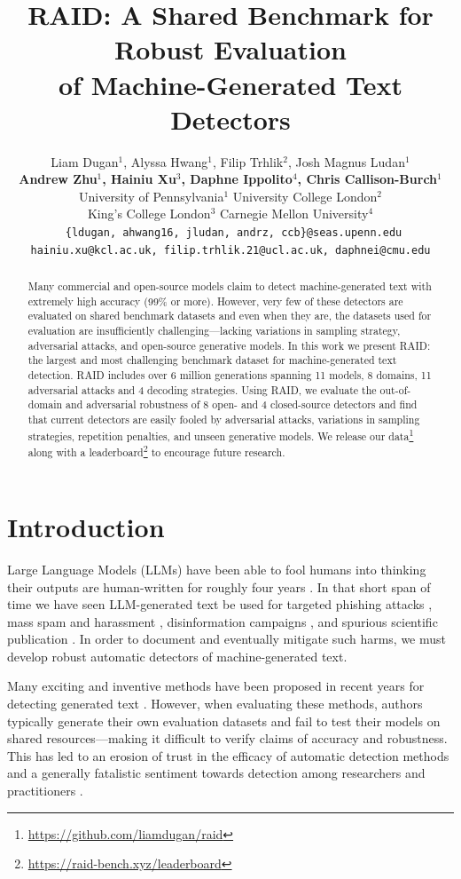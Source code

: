 \documentclass[11pt]{article}
\title{RAID: A Shared Benchmark for Robust Evaluation \\ of Machine-Generated Text Detectors}
\author{Liam Dugan$^1$, \hspace{0.25cm} Alyssa Hwang$^1$, \hspace{0.25cm} Filip Trhlik$^2$, \hspace{0.25cm} Josh Magnus Ludan$^1$\\\textbf{Andrew Zhu$^1$, \hspace{0.25cm} Hainiu Xu$^3$, \hspace{0.25cm} Daphne Ippolito$^4$, \hspace{0.25cm} Chris Callison-Burch$^1$} \\
University of Pennsylvania$^1$ \hspace{0.25cm} University College London$^2$\\ King's College London$^3$ \hspace{0.25cm} Carnegie Mellon University$^4$\\\ 
{\tt \normalsize \{ldugan, ahwang16, jludan, andrz, ccb\}@seas.upenn.edu}\\ \tt \normalsize hainiu.xu@kcl.ac.uk, filip.trhlik.21@ucl.ac.uk, daphnei@cmu.edu}
\begin{document}
\maketitle
\begin{abstract}
Many commercial and open-source models claim to detect machine-generated text with extremely high accuracy (99\% or more). However, very few of these detectors are evaluated on shared benchmark datasets and even when they are, the datasets used for evaluation are insufficiently challenging—lacking variations in sampling strategy, adversarial attacks, and open-source generative models. In this work we present RAID: the largest and most challenging benchmark dataset for machine-generated text detection. RAID includes over 6 million generations spanning 11 models, 8 domains, 11 adversarial attacks and 4 decoding strategies. Using RAID, we evaluate the out-of-domain and adversarial robustness of 8 open- and 4 closed-source detectors and find that current detectors are easily fooled by adversarial attacks, variations in sampling strategies, repetition penalties, and unseen generative models. We release our data\footnote{\url{https://github.com/liamdugan/raid}} along with a leaderboard\footnote{\url{https://raid-bench.xyz/leaderboard}} to encourage future research.
\end{abstract}

\section{Introduction}
Large Language Models (LLMs) have been able to fool humans into thinking their outputs are human-written for roughly four years \cite{dugan-etal-2020-roft, clark-etal-2021-thats}. In that short span of time we have seen LLM-generated text be used for targeted phishing attacks \cite{baki-etal-2017-scaling,hazell2023large}, mass spam and harassment \cite{weiss2019}, disinformation campaigns \cite{sharevski2023talking,spitale-etal-2023-disinformation}, and spurious scientific publication \cite{lund2023chatgpt}. In order to document and eventually mitigate such harms, we must develop robust automatic detectors of machine-generated text. 

Many exciting and inventive methods have been proposed in recent years for detecting generated text \cite{crothers-etal-2023-comprehensive}. However, when evaluating these methods, authors typically generate their own evaluation datasets and fail to test their models on shared resources---making it difficult to verify claims of accuracy and robustness. This has led to an erosion of trust in the efficacy of automatic detection methods and a generally fatalistic sentiment towards detection among researchers and practitioners \cite{sadasivan2023aigenerated}.
\end{document}
